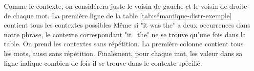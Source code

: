 \documentclass[11pt, a4paper]{report}
\begin{document}
\begin{center}
                                                                                                                                                                                                                                                                                                                                                                                                                                                                                                                                                                                                                                                                                                                                                                                                                                                                                                                                                                                                                                                                                                                                                                                                                                                                                                                                                                                                                                                                                                                                                                                                                                                                                                                                                                                                                                                                                                                                                                                                             
\end{center}
Comme le contexte, on considérera juste le voisin de gauche et le voisin de droite de chaque mot. La 
première ligne de la table \ref{tab:sémantique-distr-exemple} contient tous les contextes possibles 
Même si "it was the" a deux occurrences dans notre phrase, le contexte correspondant 
"it \textunderscore \ the" ne se trouve qu'une fois dans la table. On prend les contextes sans répétition.
La première colonne contient tous les mots, aussi sans répétition.
Finalement, pour chaque mot, les valeur dans sa ligne indique combien de fois il se trouve dans le contexte
spécifié.  
\end{document}
